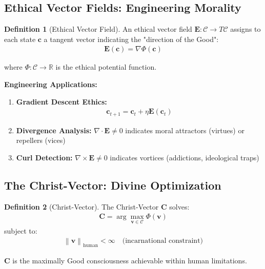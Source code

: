 \documentclass[11pt,a4paper]{article}
\theoremstyle{definition}
\newtheorem{definition}{Definition}[section]
\theoremstyle{remark}
\newcommand{\RR}{\mathbb{R}}
\newcommand{\CC}{\mathcal{C}}
\newcommand{\EE}{\mathbf{E}}
\newcommand{\cc}{\mathbf{c}}
\newcommand{\norm}[1]{\left\|#1\right\|}
\begin{document}
\subsection{Ethical Vector Fields: Engineering Morality}

\begin{definition}[Ethical Vector Field]
An ethical vector field $\EE: \CC \to T\CC$ assigns to each state $\cc$ a tangent vector indicating the "direction of the Good":
\begin{align}
\EE(\cc) = \nabla \Phi(\cc)
\end{align}

where $\Phi: \CC \to \RR$ is the ethical potential function.
\end{definition}

\textbf{Engineering Applications:}

\begin{enumerate}
\item \textbf{Gradient Descent Ethics:}
\begin{align}
\cc_{t+1} = \cc_t + \eta \EE(\cc_t)
\end{align}

\item \textbf{Divergence Analysis:} $\nabla \cdot \EE \neq 0$ indicates moral attractors (virtues) or repellers (vices)

\item \textbf{Curl Detection:} $\nabla \times \EE \neq 0$ indicates vortices (addictions, ideological traps)
\end{enumerate}

\subsection{The Christ-Vector: Divine Optimization}

\begin{definition}[Christ-Vector]
The Christ-Vector $\mathbf{C}$ solves:
\begin{align}
\mathbf{C} = \arg\max_{\mathbf{v} \in \CC} \Phi(\mathbf{v})
\end{align}
subject to:
\begin{align}
\norm{\mathbf{v}}_{\text{human}} < \infty \quad \text{(incarnational constraint)}
\end{align}

$\mathbf{C}$ is the maximally Good consciousness achievable within human limitations.
\end{definition}
\end{document}
